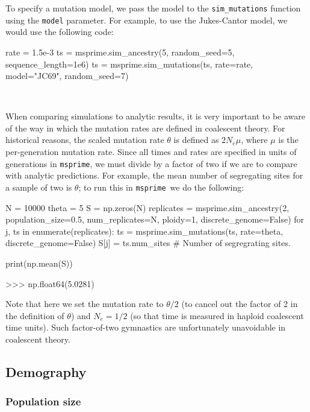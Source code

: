 \documentclass[graybox]{svmult}
\newcommand{\msprime}[0]{\texttt{msprime}}
\begin{document}
To specify a mutation model, we pass the model to the \texttt{sim\_mutations} function using the \texttt{model} parameter. For example,
to use the Jukes-Cantor model, we would use the following code:

\begin{pythoncode}
rate = 1.5e-3
ts = msprime.sim_ancestry(5, random_seed=5, sequence_length=1e6)
ts = msprime.sim_mutations(ts, rate=rate, model="JC69", random_seed=7)
\end{pythoncode}

 \

When comparing simulations to analytic results, it is very important to be aware of the way in which the
mutation rates are defined in coalescent theory. For historical reasons,
the scaled mutation rate \(\theta\) is defined as \(2N_e \mu\), where
\(\mu\) is the per-generation mutation rate. Since all times and rates
are specified in units of generations in \msprime, we must divide by a
factor of two if we are to compare with analytic predictions. For
example, the mean number of segregating sites for a sample of two is
\(\theta\); to run this in \msprime\ we do the following:

\begin{pythoncode}
N = 10000
theta = 5
S = np.zeros(N)
replicates = msprime.sim_ancestry(2, population_size=0.5,
                                  num_replicates=N,
                                  ploidy=1,
                                  discrete_genome=False)
for j, ts in enumerate(replicates):
    ts = msprime.sim_mutations(ts, rate=theta, discrete_genome=False)
    S[j] = ts.num_sites  # Number of segregrating sites.

print(np.mean(S))

>>> np.float64(5.0281)

\end{pythoncode}

    Note that here we set the mutation rate to \(\theta / 2\) (to cancel out
the factor of 2 in the definition of \(\theta\)) and \(N_e = 1/2\) (so
that time is measured in haploid coalescent time units). Such
factor-of-two gymnastics are unfortunately unavoidable in coalescent
theory.

\subsection{Demography}\label{Demography}

\subsubsection{Population size}\label{population-models}
\end{document}
